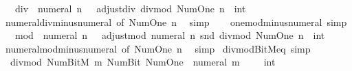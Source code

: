 \begin{isabellebody}
\ \ {\isachardoublequoteopen}{}\ div\ {\isacharminus}{\kern0pt}\ numeral\ n\ {\isacharequal}{\kern0pt}\ {\isacharminus}{\kern0pt}\ {\isacharparenleft}{\kern0pt}adjust{\isacharunderscore}{\kern0pt}div\ {\isacharparenleft}{\kern0pt}divmod\ Num{\isachardot}{\kern0pt}One\ n{\isacharparenright}{\kern0pt}\ {\isacharcolon}{\kern0pt}{\isacharcolon}{\kern0pt}\ int{\isacharparenright}{\kern0pt}{\isachardoublequoteclose}\isanewline
%
\isadelimproof
\ \ %
\endisadelimproof
%
\isatagproof
{}\isamarkupfalse%
\ numeral{\isacharunderscore}{\kern0pt}div{\isacharunderscore}{\kern0pt}minus{\isacharunderscore}{\kern0pt}numeral\ {\isacharbrackleft}{\kern0pt}of\ Num{\isachardot}{\kern0pt}One\ n{\isacharbrackright}{\kern0pt}\ \isamarkupfalse%
\ simp%
\endisatagproof
{\isafoldproof}%
%
\isadelimproof
\isanewline
%
\endisadelimproof
\ \ \isanewline
{}\isamarkupfalse%
\ one{\isacharunderscore}{\kern0pt}mod{\isacharunderscore}{\kern0pt}minus{\isacharunderscore}{\kern0pt}numeral\ {\isacharbrackleft}{\kern0pt}simp{\isacharbrackright}{\kern0pt}{\isacharcolon}{\kern0pt}\isanewline
\ \ {\isachardoublequoteopen}{}\ mod\ {\isacharminus}{\kern0pt}\ numeral\ n\ {\isacharequal}{\kern0pt}\ {\isacharminus}{\kern0pt}\ adjust{\isacharunderscore}{\kern0pt}mod\ {\isacharparenleft}{\kern0pt}numeral\ n{\isacharparenright}{\kern0pt}\ {\isacharparenleft}{\kern0pt}snd\ {\isacharparenleft}{\kern0pt}divmod\ Num{\isachardot}{\kern0pt}One\ n{\isacharparenright}{\kern0pt}\ {\isacharcolon}{\kern0pt}{\isacharcolon}{\kern0pt}\ int{\isacharparenright}{\kern0pt}{\isachardoublequoteclose}\isanewline
%
\isadelimproof
\ \ %
\endisadelimproof
%
\isatagproof
{}\isamarkupfalse%
\ numeral{\isacharunderscore}{\kern0pt}mod{\isacharunderscore}{\kern0pt}minus{\isacharunderscore}{\kern0pt}numeral\ {\isacharbrackleft}{\kern0pt}of\ Num{\isachardot}{\kern0pt}One\ n{\isacharbrackright}{\kern0pt}\ \isamarkupfalse%
\ simp%
\endisatagproof
{\isafoldproof}%
%
\isadelimproof
\isanewline
%
\endisadelimproof
\isanewline
{}\isamarkupfalse%
\isanewline
\isanewline
{}\isamarkupfalse%
\ divmod{\isacharunderscore}{\kern0pt}BitM{\isacharunderscore}{\kern0pt}{}{\isacharunderscore}{\kern0pt}eq\ {\isacharbrackleft}{\kern0pt}simp{\isacharbrackright}{\kern0pt}{\isacharcolon}{\kern0pt}\isanewline
\ \ {\isacartoucheopen}divmod\ {\isacharparenleft}{\kern0pt}Num{\isachardot}{\kern0pt}BitM\ m{\isacharparenright}{\kern0pt}\ {\isacharparenleft}{\kern0pt}Num{\isachardot}{\kern0pt}Bit{}\ Num{\isachardot}{\kern0pt}One{\isacharparenright}{\kern0pt}\ {\isacharequal}{\kern0pt}\ {\isacharparenleft}{\kern0pt}numeral\ m\ {\isacharminus}{\kern0pt}\ {}{\isacharcomma}{\kern0pt}\ {\isacharparenleft}{\kern0pt}{}\ {\isacharcolon}{\kern0pt}{\isacharcolon}{\kern0pt}\ int{\isacharparenright}{\kern0pt}{\isacharparenright}{\kern0pt}{\isacartoucheclose}\isanewline

\end{isabellebody}
